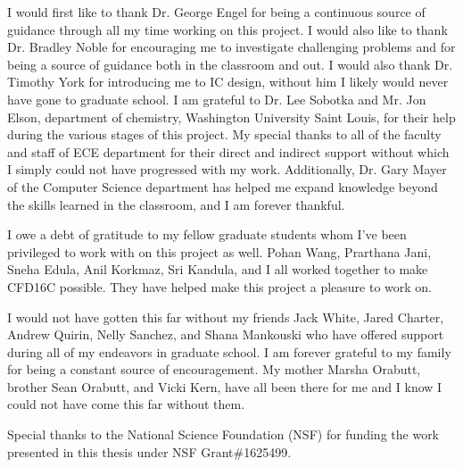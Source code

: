 \documentclass[12pt,oneside,final]{siuethesis}
\theoremstyle{definition}
\begin{document}
\begin{acknowledgements} 

\par I would first like to thank Dr. George Engel for being a continuous source of guidance through all my time working on this project. I would also like to thank Dr. Bradley Noble for encouraging me to investigate challenging problems and for being a source of guidance both in the classroom and out. I would also thank Dr. Timothy York for introducing me to IC design, without him I likely would never have gone to graduate school. I am grateful to  Dr.  Lee  Sobotka  and  Mr.  Jon  Elson,  department  of  chemistry, Washington  University Saint Louis, for their  help  during  the  various  stages  of  this  project. My  special  thanks  to all of the  faculty  and  staff  of  ECE  department  for  their  direct  and indirect support without which I simply could not have progressed with my work. Additionally, Dr. Gary Mayer of the Computer Science department has helped me expand knowledge beyond the skills learned in the classroom, and I am forever thankful. 
\par I owe a debt of gratitude to my fellow graduate students whom I've been privileged to work with on this project as well. Pohan Wang, Prarthana Jani, Sneha Edula, Anil Korkmaz, Sri Kandula, and I all worked together to make CFD16C possible. They have helped make this project a pleasure to work on.
\par I would not have gotten this far without my friends Jack White, Jared Charter, Andrew Quirin, Nelly Sanchez, and Shana Mankouski who have offered support during all of my endeavors in graduate school. I am forever grateful to my family for being a constant source of encouragement. My mother Marsha Orabutt, brother Sean Orabutt, and Vicki Kern, have all been there for me and I know I could not have come this far without them.
\par Special thanks to the National Science Foundation (NSF) for funding the work presented in this thesis under NSF Grant\#1625499.

\end{acknowledgements}

\tableofcontents

\cleardoublepage %

\cleardoublepage

\listoffigures %

\cleardoublepage
\end{document}
